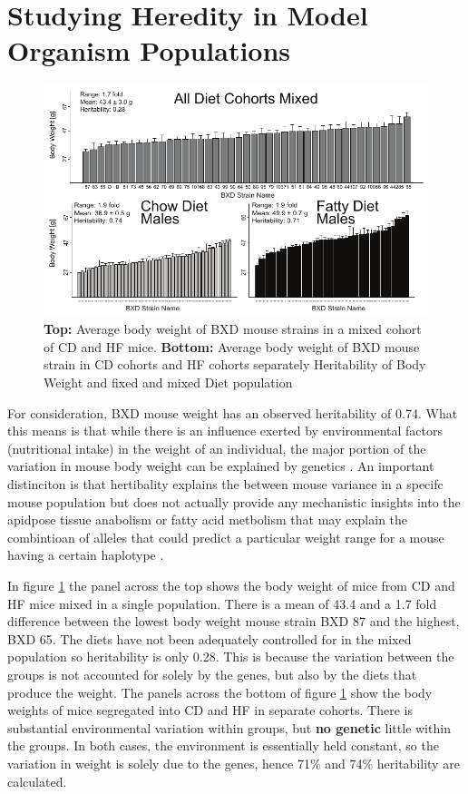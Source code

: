 \documentclass[a4paper,11pt,twoside]{book}
\begin{document}
	\section{Studying Heredity in Model Organism Populations}
	\begin{figure}[!htbp]
		\includegraphics[width=\textwidth]{1.Introduction_Figures/BodyWeights.pdf}
		\caption{ \textbf{Top:} Average body weight of BXD mouse strains in a mixed cohort of CD and HF mice. \textbf{Bottom:} Average body weight of BXD mouse strain in CD cohorts and HF cohorts separately
			Heritability of Body Weight and fixed and mixed Diet population}
		\label{fig:Heritablity in Diet and Mixed Populations}
	\end{figure}
	
	For consideration, BXD mouse weight has an observed heritability of 0.74. What this means is that while there is an influence exerted by environmental factors (nutritional intake) in the weight of an individual, the major portion of the variation in mouse body weight can be explained by genetics \citep{GerhardAdam2012}. An important distinciton is that hertibality explains the between mouse variance in a specifc mouse population but does not actually provide any mechanistic insights into the apidpose tissue anabolism or fatty acid metbolism that may explain the combintioan of alleles that could predict a particular weight range for a mouse having a certain haplotype \citep{GerhardAdam2012}.
	
	 In figure \ref{fig:Heritablity in Diet and Mixed Populations} the panel across the top shows the body weight of mice from CD and HF mice mixed in a single population. There is a mean of 43.4 and a 1.7 fold difference between the lowest body weight mouse strain BXD 87 and the highest, BXD 65. The diets have not been adequately controlled for in the mixed population so heritability is only 0.28.  This is because the variation between the groups is not accounted for solely by the genes, but also by the diets that produce the weight.  The panels across the bottom of figure \ref{fig:Heritablity in Diet and Mixed Populations} show the body weights of mice segregated into CD and HF in separate cohorts. There is substantial environmental variation within  groups, but \textbf{no genetic} little within the groups. In both cases, the environment is essentially held constant, so the variation in weight is solely due to the genes, hence 71\% and 74\% heritability are calculated.
	
\end{document}
